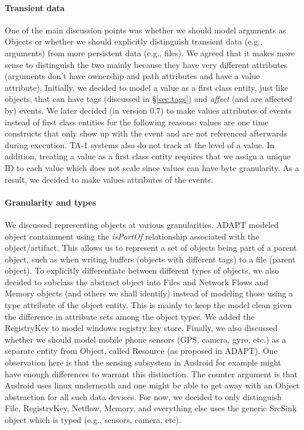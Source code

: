 \documentclass[10pt, conference, onecolumn]{IEEEtran}
\begin{document}
\paragraph{Transient data} 
One of the main discussion points was whether we should model arguments as Objects or whether we should explicitly distinguish transient data (e.g., arguments) from more persistent data (e.g., files). 
We agreed that it makes more sense to distinguish the two mainly because they have very different attributes (arguments don't have ownership and path attributes and have a value attribute). 
Initially, we decided to model a value as a first class entity, just like objects, that can have tags (discussed in \S \ref{sec:tags}) and \textit{affect} (and are affected by) events. 
We later decided (in version 0.7) to make values attributes of events instead of first class entities for the following reasons: values are one time constructs that only show up with the event and are not referenced afterwards during execution. TA-1 systems also do not track at the level  of a value. In addition, treating a value as a first class entity requires that we assign a unique ID to each value which does not scale since values can have byte granularity. As a result, we decided to make values attributes of the events.

\paragraph{Granularity and types} We discussed representing objects at various granularities. ADAPT modeled object containment using the \textit{isPartOf} relationship associated with the object/artifact. This allows us to represent a set of objects being part of a parent object, such as when writing buffers (objects with different tags) to a file (parent object). To explicitly differentiate between different types of objects, we also decided to subclass the abstract object into Files and Network Flows and Memory objects (and others we shall identify) instead of modeling those using a type attribute of the object entity. This is mainly to keep the model clean given the difference in attribute sets among the object types. 
We added the RegistryKey to model windows registry key store.
Finally, we also discussed whether we should model mobile phone sensors (GPS, camera, gyro, etc.) as a separate entity from Object, called Resource (as proposed in ADAPT). One observation here is that the sensing subsystem in Android for example might have enough differences to warrant this distinction. The counter argument is that Android uses linux underneath and one might be able to get away with an Object abstraction for all such data devices. For now, we decided to only distinguish File, RegistryKey, Netflow, Memory, and everything else uses the generic SrcSink object which is typed (e.g., sensors, camera, etc). 
\end{document}

